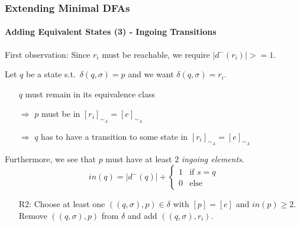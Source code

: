 \begin{frame}
	\frametitle{Extending Minimal DFAs}
	\framesubtitle{Adding Equivalent States (3) - Ingoing Transitions}
	
	First observation: Since $r_i$ must be reachable, we require $|d^-(r_i)| >= 1$.
	
	\vspace{0.2cm}
	Let $q$ be a state s.t.\ $\delta(q,\sigma)=p$ and we want $\delta(q,\sigma)=r_i$.\pause
	
	\vspace{0.2cm}
	\begin{itemize}
		\item[] $q$ must remain in its equivalence class
		
		\item[$\Rightarrow$] $p$ must be in $[r_i]_{\sim_A} = [e]_{\sim_A}$
		
		\item[$\Rightarrow$] $q$ has to have a transition to some state in $[r_i]_{\sim_A} = [e]_{\sim_A}$\pause
	\end{itemize}
	
	\vspace{0.2cm}
	Furthermore, we see that $p$ must have at least $2$ \emph{ingoing elements}.
	\[
	in(q) = |d^-(q)| + \begin{cases}
	1 & \text{if } s = q\\
	0 & \text{else}
	\end{cases}
	\]\pause
	\begin{itemize}
		\item[R2:] Choose at least one $((q, \sigma), p) \in \delta$ with $[p] = [e]$ and $in(p) \geq 2$. Remove $((q, \sigma), p)$ from $\delta$ and add $((q, \sigma), r_i)$.
	\end{itemize}
\end{frame}

